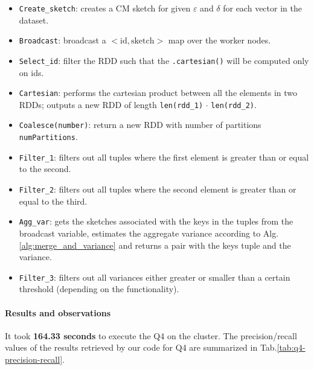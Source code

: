 \begin{itemize}
    \item \texttt{Create_sketch}: creates a CM sketch for given $\varepsilon$ and $\delta$ for each vector in the dataset.
    \item \texttt{Broadcast}: broadcast a $<\textrm{id}, \textrm{sketch}>$ map over the worker nodes.
    \item \texttt{Select_id}: filter the RDD such that the \texttt{.cartesian()} will be computed only on ids.
    \item \texttt{Cartesian}: performs the cartesian product between all the elements in two RDDs; outputs a new RDD of length \texttt{len(rdd_1)} $\cdot$ \texttt{len(rdd_2)}.
    \item \texttt{Coalesce(number)}: return a new RDD with number of partitions \texttt{numPartitions}.
    \item \texttt{Filter_1}: filters out all tuples where the first element is greater than or equal to the second.
    \item \texttt{Filter_2}: filters out all tuples where the second element is greater than or equal to the third.
    \item \texttt{Agg_var}: gets the sketches associated with the keys in the tuples from the broadcast variable, estimates the aggregate variance according to Alg.\ref{alg:merge_and_variance} and returns a pair with the keys tuple and the variance. 
    \item \texttt{Filter_3}: filters out all variances either greater or smaller than a certain threshold (depending on the functionality).
\end{itemize}

\paragraph{\textbf{Results and observations}}
It took \textbf{164.33 seconds} to execute the Q4 on the cluster. The precision/recall values of the results retrieved by our code for Q4 are summarized in Tab.\ref{tab:q4-precision-recall}.

\begin{table}[H]
  \centering
  
\end{table}

